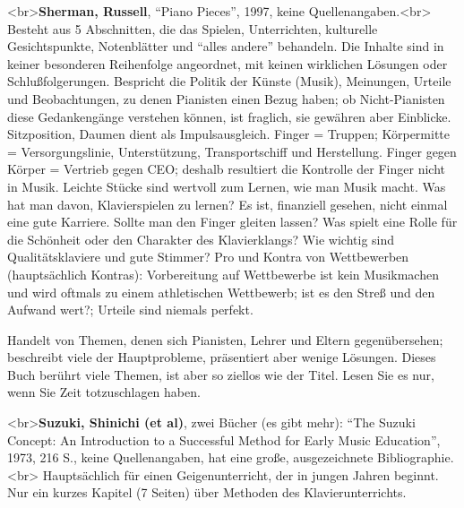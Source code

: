 \hypertarget{Sherman}{}

<br>\textbf{Sherman, Russell}, \enquote{Piano Pieces}, 1997, keine Quellenangaben.<br>  Besteht aus 5 Abschnitten, die das Spielen, Unterrichten, kulturelle Gesichtspunkte, Notenblätter und \enquote{alles andere} behandeln.
Die Inhalte sind in keiner besonderen Reihenfolge angeordnet, mit keinen wirklichen Lösungen oder Schlußfolgerungen.
Bespricht die Politik der Künste (Musik), Meinungen, Urteile und Beobachtungen, zu denen Pianisten einen Bezug haben; ob Nicht-Pianisten diese Gedankengänge verstehen können, ist fraglich, sie gewähren aber Einblicke.
Sitzposition, Daumen dient als Impulsausgleich.
Finger = Truppen; Körpermitte = Versorgungslinie, Unterstützung, Transportschiff und Herstellung.
Finger gegen Körper = Vertrieb gegen CEO; deshalb resultiert die Kontrolle der Finger nicht in Musik.
Leichte Stücke sind wertvoll zum Lernen, wie man Musik macht.
Was hat man davon, Klavierspielen zu lernen?
Es ist, finanziell gesehen, nicht einmal eine gute Karriere.
Sollte man den Finger gleiten lassen?
Was spielt eine Rolle für die Schönheit oder den Charakter des Klavierklangs?
Wie wichtig sind Qualitätsklaviere und gute Stimmer?
Pro und Kontra von Wettbewerben (hauptsächlich Kontras): Vorbereitung auf Wettbewerbe ist kein Musikmachen und wird oftmals zu einem athletischen Wettbewerb; ist es den Streß und den Aufwand wert?; Urteile sind niemals perfekt.

Handelt von Themen, denen sich Pianisten, Lehrer und Eltern gegenübersehen; beschreibt viele der Hauptprobleme, präsentiert aber wenige Lösungen.
Dieses Buch berührt viele Themen, ist aber so ziellos wie der Titel.
Lesen Sie es nur, wenn Sie Zeit totzuschlagen haben.


\hypertarget{Suzuki}{}

<br>\textbf{Suzuki, Shinichi (et al)}, zwei Bücher (es gibt mehr): \enquote{The Suzuki Concept: An Introduction to a Successful Method for Early Music Education}, 1973, 216 S., keine Quellenangaben, hat eine große, ausgezeichnete Bibliographie.<br>
Hauptsächlich für einen Geigenunterricht, der in jungen Jahren beginnt.
Nur ein kurzes Kapitel (7 Seiten) über Methoden des Klavierunterrichts.

